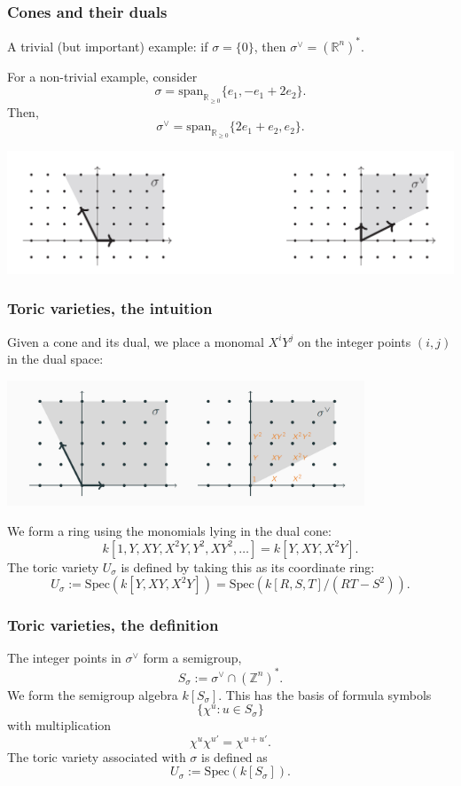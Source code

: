 \documentclass{beamer}
\theoremstyle{definition}
\theoremstyle{definition}
\begin{document}
\begin{frame}
\frametitle{Cones and their duals}
A trivial (but important) example:
if $\sigma = \{0\}$, then $\sigma^\vee = (\mathbb{R}^n)^*$.

For a non-trivial example, consider
$$\sigma = \mathrm{span}_{\mathbb{R}_{\ge 0}}\{e_1, -e_1 + 2 e_2\}.$$
Then,
$$\sigma^\vee = \mathrm{span}_{\mathbb{R}_{\ge 0}}\{2 e_1 + e_2, e_2\}.$$
\centerline{\includegraphics[width=\textwidth]{cone_and_dual}}
\end{frame}

\begin{frame}
\frametitle{Toric varieties, the intuition}
Given a cone and its dual, we place a monomal $X^i Y^j$ on the integer points $(i, j)$ in the dual space:

\centerline{\includegraphics[width=0.8\textwidth]{cone_and_dual_with_monomials}}

We form a ring using the monomials lying in the dual cone:
$$k[1, Y, XY, X^2Y, Y^2, XY^2, \ldots] = k[Y, XY, X^2Y].$$
The toric variety $U_\sigma$ is defined by taking this as its coordinate ring:
$$U_\sigma := \mathrm{Spec}(k[Y, XY, X^2 Y]) = \mathrm{Spec}(k[R, S, T]/(RT - S^2)).$$
\end{frame}

\begin{frame}
\frametitle{Toric varieties, the definition}
The integer points in $\sigma^\vee$ form a \alert{semigroup},
$$S_\sigma := \sigma^\vee \cap (\mathbb{Z}^n)^*.$$
We form the \alert{semigroup algebra} $k[S_\sigma]$.
This has the basis of formula symbols 
$$\{\chi^u : u \in S_\sigma\}$$
with multiplication 
$$\chi^u \chi^{u'} = \chi^{u + u'}.$$
The \alert{toric variety} associated with $\sigma$ is defined as
$$U_\sigma := \mathrm{Spec}(k[S_\sigma]).$$
\end{frame}
\end{document}
